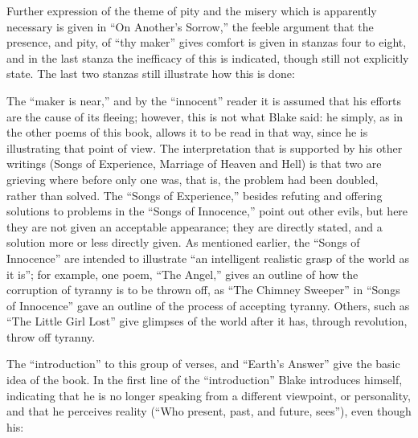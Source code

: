 Further expression of the theme of pity and the misery which is apparently necessary is given in \enquote{On Another's Sorrow,} the
feeble argument that the presence, and pity, of \enquote{thy maker} gives comfort is given in stanzas four to eight, and in
the last stanza the inefficacy of this is indicated, though still not explicitly state. The last two stanzas still illustrate how this is done:


The \enquote{maker is near,} and by the \enquote{innocent} reader it is assumed that his efforts are the cause of its fleeing; however, this
is not what Blake said: he simply, as in the other poems of this book, allows it to be read in that way, since he is illustrating
that point of view. The interpretation that is supported by his other writings (Songs of Experience, Marriage of Heaven and Hell) is that
two are grieving where before only one was, that is, the problem had been doubled, rather than solved. The \enquote{Songs of Experience,}
besides refuting and offering solutions to problems in the \enquote{Songs of Innocence,} point out other evils, but here they are not given an
acceptable appearance; they are directly stated, and a solution more or less directly given. As mentioned earlier, the \enquote{Songs of Innocence} are
intended to illustrate \enquote{an intelligent realistic grasp of the world as it is}; for example, one poem, \enquote{The Angel,} gives an
outline of how the corruption of tyranny is to be thrown off, as \enquote{The Chimney Sweeper} in \enquote{Songs of Innocence} gave an outline of the
process of accepting tyranny. Others, such as \enquote{The Little Girl Lost} give glimpses of the world after it has, through revolution, throw off tyranny.

The \enquote{introduction} to this group of verses, and \enquote{Earth's Answer} give the basic idea of the book. In the first line of the \enquote{introduction} Blake
introduces himself, indicating that he is no longer speaking from a different viewpoint, or personality, and that he perceives reality
(\enquote{Who present, past, and future, sees}), even though his:

